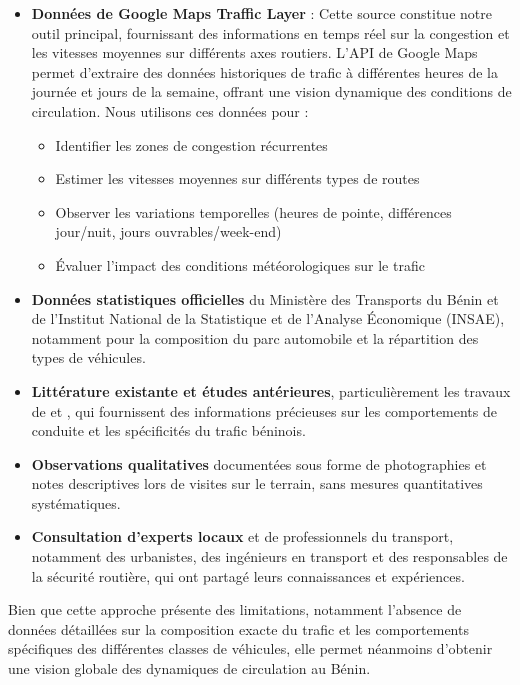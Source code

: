 \begin{itemize}
\item \textbf{Données de Google Maps Traffic Layer} : Cette source constitue notre outil principal, fournissant des informations en temps réel sur la congestion et les vitesses moyennes sur différents axes routiers. L'API de Google Maps permet d'extraire des données historiques de trafic à différentes heures de la journée et jours de la semaine, offrant une vision dynamique des conditions de circulation. Nous utilisons ces données pour :
  \begin{itemize}
    \item Identifier les zones de congestion récurrentes
    \item Estimer les vitesses moyennes sur différents types de routes
    \item Observer les variations temporelles (heures de pointe, différences jour/nuit, jours ouvrables/week-end)
    \item Évaluer l'impact des conditions météorologiques sur le trafic
  \end{itemize}

\item \textbf{Données statistiques officielles} du Ministère des Transports du Bénin et de l'Institut National de la Statistique et de l'Analyse Économique (INSAE), notamment pour la composition du parc automobile et la répartition des types de véhicules.

\item \textbf{Littérature existante et études antérieures}, particulièrement les travaux de \cite{loggoh2019traffic} et \cite{aerc2019taxi}, qui fournissent des informations précieuses sur les comportements de conduite et les spécificités du trafic béninois.

\item \textbf{Observations qualitatives} documentées sous forme de photographies et notes descriptives lors de visites sur le terrain, sans mesures quantitatives systématiques.

\item \textbf{Consultation d'experts locaux} et de professionnels du transport, notamment des urbanistes, des ingénieurs en transport et des responsables de la sécurité routière, qui ont partagé leurs connaissances et expériences.
\end{itemize}

\begin{remark}
Bien que cette approche présente des limitations, notamment l'absence de données détaillées sur la composition exacte du trafic et les comportements spécifiques des différentes classes de véhicules, elle permet néanmoins d'obtenir une vision globale des dynamiques de circulation au Bénin.
\end{remark}

